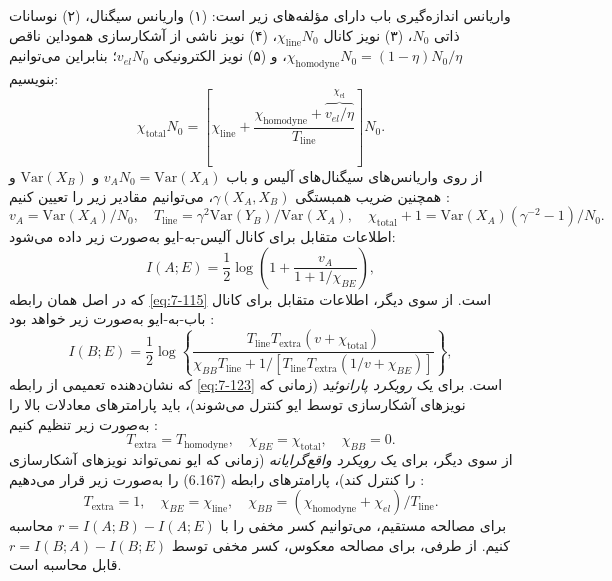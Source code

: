 واریانس اندازه‌گیری باب دارای مؤلفه‌های زیر است: (۱) واریانس سیگنال، (۲) نوسانات ذاتی $N_0$، (۳) نویز کانال $\chi_{\text{line}} N_0$، (۴) نویز ناشی از آشکارسازی هموداین ناقص $\chi_{\text{homodyne}} N_0 = (1 - \eta)N_0 / \eta$، و (۵) نویز الکترونیکی $v_{el} N_0$؛ بنابراین می‌توانیم بنویسیم:
\begin{equation}
	\chi_{\text{total}} N_0 = \left[ \chi_{\text{line}} + \frac{\chi_{\text{homodyne}} + \overbrace{v_{el}/\eta}^{\chi_{\text{el}}}}{T_{\text{line}}} \right] N_0.
	\label{eq:7-133}
\end{equation}
از روی واریانس‌های سیگنال‌های آلیس و باب $v_A N_0 = \text{Var}(X_A)$ و $\text{Var}(X_B)$ و همچنین ضریب همبستگی $\gamma(X_A, X_B)$، می‌توانیم مقادیر زیر را تعیین کنیم \cite{7-7}:
\begin{equation}
	v_A = \text{Var}(X_A)/N_0, \quad T_{\text{line}} = \gamma^2 \text{Var}(Y_B) / \text{Var}(X_A), \quad \chi_{\text{total}} + 1 = \text{Var}(X_A)(\gamma^{-2} - 1)/N_0.
	\label{eq:7-134}
\end{equation}
اطلاعات متقابل برای کانال آلیس-به-ایو به‌صورت زیر داده می‌شود:
\begin{equation}
	I(A; E) = \frac{1}{2} \log \left( 1 + \frac{v_A}{1 + 1/\chi_{BE}} \right),
	\label{eq:7-135}
\end{equation}
که در اصل همان رابطه \eqref{eq:7-115} است. از سوی دیگر، اطلاعات متقابل برای کانال باب-به-ایو به‌صورت زیر خواهد بود \cite{7-7, 7-106, 7-107}:
\begin{equation}
	I(B; E) = \frac{1}{2} \log \left\{ \frac{T_{\text{line}} T_{\text{extra}} (v + \chi_{\text{total}})}{\chi_{BB} T_{\text{line}} + 1 / [T_{\text{line}} T_{\text{extra}} (1/v + \chi_{BE})]} \right\},
	\label{eq:7-136}
\end{equation}
که نشان‌دهنده تعمیمی از رابطه \eqref{eq:7-123} است. برای یک \textit{رویکرد پارانوئید} (زمانی که نویزهای آشکارسازی توسط ایو کنترل می‌شوند)، باید پارامترهای معادلات بالا را به‌صورت زیر تنظیم کنیم \cite{7-7, 7-106, 7-107}:
\begin{equation}
	T_{\text{extra}} = T_{\text{homodyne}}, \quad \chi_{BE} = \chi_{\text{total}}, \quad \chi_{BB} = 0.
	\label{eq:7-137}
\end{equation}
از سوی دیگر، برای یک \textit{رویکرد واقع‌گرایانه} (زمانی که ایو نمی‌تواند نویزهای آشکارسازی را کنترل کند)، پارامترهای رابطه (6.167) را به‌صورت زیر قرار می‌دهیم \cite{7-7, 7-106, 7-107}:
\begin{equation}
	T_{\text{extra}} = 1, \quad \chi_{BE} = \chi_{\text{line}}, \quad \chi_{BB} = (\chi_{\text{homodyne}} + \chi_{el})/T_{\text{line}}.
	\label{eq:7-138}
\end{equation}
برای مصالحه مستقیم، می‌توانیم کسر مخفی را با $r = I(A; B) - I(A; E)$ محاسبه کنیم. از طرفی، برای مصالحه معکوس، کسر مخفی توسط $r = I(B; A) - I(B; E)$ قابل محاسبه است.









